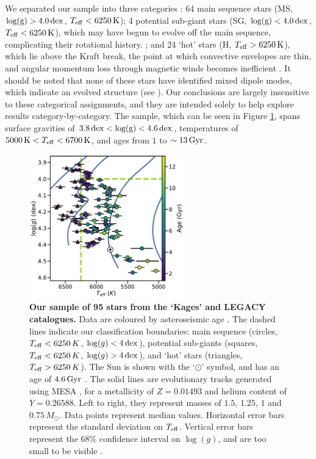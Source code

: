 \documentclass[12pt]{article}
\newcommand{\teff}{\mbox{$T_{\rm eff}$}\xspace}
\newcommand{\logg}{\mbox{$\log(g)$}\xspace}
\begin{document}
We separated our sample into three categories \cite{garcia+2014}: 64 main sequence stars (MS, $\rm{log(g)} > 4.0\, \rm dex$, $T_{\rm eff} < 6250\, \rm K$); 4 potential sub-giant stars (SG, $\rm{log(g)} < 4.0\, \rm dex$, $T_{\rm eff} < 6250\, \rm K$), which may have begun to evolve off the main sequence, complicating their rotational history. ; and 24 `hot' stars (H, $T_{\rm eff} > 6250\, \rm K$), which lie above the Kraft break, the point at which convective envelopes are thin, and angular momentum loss through magnetic winds becomes inefficient \cite{kraft1967}. It should be noted that none of these stars have identified mixed dipole modes, which indicate an evolved structure (see \cite{bedding+2010}). Our conclusions are largely insensitive to these categorical assignments, and they are intended solely to help explore results category-by-category. The sample, which can be seen in Figure \ref{fig:sample}, spans surface gravities of $3.8\, \rm{dex} < \rm{log(g)} < 4.6\, \rm{dex}$, temperatures of $5000\, \textrm{K} < T_{\rm eff} <  6700\, \rm{K}$, and ages from $1$ to $\sim 13\, \rm{Gyr}$.\\

\begin{figure}[h!]
	\centering
	\includegraphics[width=0.6\textwidth]{data_Fig1.pdf}
	\caption{\textbf{Our sample of 95 stars from the `Kages' and LEGACY catalogues.} Data are coloured by asteroseismic age  \cite{silvaaguirre+2015, silvaaguirre+2017}. The dashed lines indicate our classification boundaries: main sequence (circles, $\teff < 6250\, K$, $\logg < 4\, \rm{dex}$), potential sub-giants (squares, $\teff < 6250\, K$, $\logg > 4\, \rm{dex}$), and `hot' stars (triangles, $\teff > 6250\, K$). The Sun is shown with the `$\odot$' symbol, and has an age of $4.6\, \rm{Gyr}$ \cite{bonanno+frohlich2015}. The solid lines are evolutionary tracks generated using MESA \cite{paxton+2017}, for a metallicity of $Z = 0.01493$ and helium content of $Y = 0.26588$. Left to right, they represent masses of $1.5$, $1.25$, $1$ and $0.75\, M_\odot$. Data points represent median values. Horizontal error bars represent the standard deviation on \teff. Vertical error bars represent the 68\% confidence interval on \logg, and are too small to be visible \cite{hunter2007}.}
	\label{fig:sample}
\end{figure}
\end{document}
